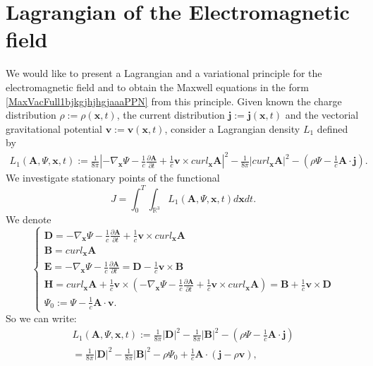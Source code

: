\documentclass{article}
\theoremstyle{definition}
\theoremstyle{remark}
\renewcommand{\vec}[1]{\mathbf{#1}}
\newcommand{\er}{\eqref}
\newcommand{\er}{\eqref}
\begin{document}
\section{Lagrangian of the Electromagnetic field}\label{bhjghjfghfg} We would like to
present a Lagrangian and a variational principle for the
electromagnetic field and to obtain the Maxwell equations in the
form \er{MaxVacFull1bjkgjhjhgjaaaPPN} from this principle. Given
known the charge distribution $\rho:=\rho(\vec x,t)$, the current
distribution $\vec j:=\vec j(\vec x,t)$ and the vectorial
gravitational potential $\vec v:=\vec v(\vec x,t)$, consider a
Lagrangian density $L_1$ defined by
\begin{multline}\label{vhfffngghkjgghPPN}
L_1\left(\vec A,\Psi,\vec
x,t\right):=\frac{1}{8\pi}\left|-\nabla_{\vec
x}\Psi-\frac{1}{c}\frac{\partial\vec A}{\partial t}+\frac{1}{c}\vec
v\times curl_{\vec x}\vec A\right|^2-\frac{1}{8\pi}\left|curl_{\vec
x}\vec A\right|^2-\left(\rho\Psi-\frac{1}{c}\vec A\cdot\vec
j\right).
\end{multline}
We investigate stationary points of the functional
\begin{equation}\label{btfffygtgyggyPPN}
J=\int_0^T\int_{\mathbb{R}^3}L_1\left(\vec A,\Psi,\vec
x,t\right)d\vec x dt.
\end{equation}
We denote
\begin{equation}\label{guigjgjffghPPN}
\begin{cases}
\vec D=-\nabla_{\vec x}\Psi-\frac{1}{c}\frac{\partial\vec
A}{\partial t}+\frac{1}{c}\vec
v\times curl_{\vec x}\vec A\\
\vec B=curl_{\vec x}\vec A
\\
\vec E=-\nabla_{\vec x}\Psi-\frac{1}{c}\frac{\partial\vec A}{\partial t}=\vec D-\frac{1}{c}\vec v\times\vec B\\
\vec H=curl_{\vec x}\vec A+\frac{1}{c}\vec
v\times\left(-\nabla_{\vec x}\Psi-\frac{1}{c}\frac{\partial\vec
A}{\partial t}+\frac{1}{c}\vec v\times curl_{\vec x}\vec
A\right)=\vec B+\frac{1}{c}\vec
v\times\vec D\\
\Psi_0:=\Psi-\frac{1}{c}\vec A\cdot\vec v.
\end{cases}
\end{equation}
So we can write:
\begin{multline}\label{vhfffngghkjgghPPNggjgjjkgj}
L_1\left(\vec A,\Psi,\vec x,t\right):=\frac{1}{8\pi}\left|\vec
D\right|^2-\frac{1}{8\pi}\left|\vec
B\right|^2-\left(\rho\Psi-\frac{1}{c}\vec A\cdot\vec
j\right)\\=\frac{1}{8\pi}\left|\vec
D\right|^2-\frac{1}{8\pi}\left|\vec
B\right|^2-\rho\Psi_0+\frac{1}{c}\vec A\cdot(\vec j-\rho\vec v),
\end{multline}
\end{document}
